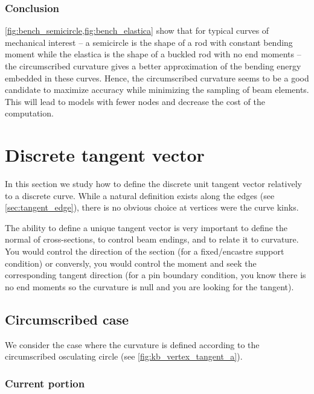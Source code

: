 \subsubsection{Conclusion}
\cref{fig:bench_semicircle,fig:bench_elastica} show that for typical curves of mechanical interest -- a semicircle is the shape of a rod with constant bending moment while the elastica is the shape of a buckled rod with no end moments -- the circumscribed curvature gives a better approximation of the bending energy embedded in these curves. Hence, the circumscribed curvature seems to be a good candidate to maximize accuracy while minimizing the sampling of beam elements. This will lead to models with fewer nodes and decrease the cost of the computation.

\section{Discrete tangent vector}\label{sec:discrete_tangent}

In this section we study how to define the discrete unit tangent vector relatively to a discrete curve. While a natural definition exists along the edges (see \cref{sec:tangent_edge}), there is no obvious choice at vertices were the curve kinks.

The ability to define a unique tangent vector is very important to define the normal of cross-sections, to control beam endings, and to relate it to curvature.
You would control the direction of the section (for a fixed/encastre support condition) or conversly, you would control the moment and seek the corresponding tangent direction (for a pin boundary condition, you know there is no end moments so the curvature is null and you are looking for the tangent).

\subsection{Circumscribed case}

We consider the case where the curvature is defined according to the circumscribed osculating circle (see \cref{fig:kb_vertex_tangent_a}). 

\subsubsection{Current portion}

